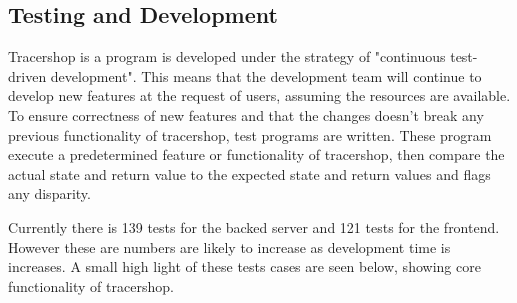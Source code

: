 \documentclass{article}
\begin{document}
\subsection*{Testing and Development}

Tracershop is a program is developed under the strategy of "continuous test-driven development". This means that the development team will continue to develop new features at the request of users, assuming the resources are available. To ensure correctness of new features and that the changes doesn't break any previous functionality of tracershop, test programs are written. These program execute a predetermined feature or functionality of tracershop, then compare the actual state and return value to the expected state and return values and flags any disparity.

Currently there is 139 tests for the backed server and 121 tests for the frontend. However these are numbers are likely to increase as development time is increases. A small high light of these tests cases are seen below, showing core functionality of tracershop.


\end{document}
